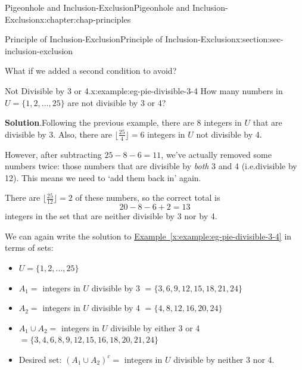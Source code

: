 \documentclass[oneside,10pt,]{book}
\newcommand{\blocktitlefont}{\relax}
\newcommand{\xreffont}{\relax}
\numberwithin{equation}{section}
\begin{document}
\begin{chapterptx}{Pigeonhole and Inclusion-Exclusion}{}{Pigeonhole and Inclusion-Exclusion}{}{}{x:chapter:chap-principles}
\begin{sectionptx}{Principle of Inclusion-Exclusion}{}{Principle of Inclusion-Exclusion}{}{}{x:section:sec-inclusion-exclusion}
%
\par
What if we added a second condition to avoid?%
\begin{example}{Not Divisible by 3 or 4.}{x:example:eg-pie-divisible-3-4}%
How many numbers in \(U = \{1,2,\ldots,25\}\) are not divisible by 3 or 4?%
\par\smallskip%
\noindent\textbf{\blocktitlefont Solution}.\hypertarget{g:solution:id478429}{}\quad{}Following the previous example, there are \(8\) integers in \(U\) that are divisible by 3. Also, there are \(\lfloor \frac{25}{4} \rfloor = 6\) integers in \(U\) not divisible by 4.%
\par
However, after subtracting \(25 - 8 - 6 = 11\), we've actually removed some numbers twice: those numbers that are divisible by \emph{both} 3 and 4 (i.e.\@ divisible by 12). This means we need to `add them back in' again.%
\par
There are \(\lfloor \frac{25}{12} \rfloor = 2\) of these numbers, so the correct total is%
\begin{equation*}
20 - 8 - 6 + 2 = 13
\end{equation*}
integers in the set that are neither divisible by 3 nor by 4.%
\end{example}
We can again write the solution to \hyperref[x:example:eg-pie-divisible-3-4]{Example~{\xreffont\ref{x:example:eg-pie-divisible-3-4}}} in terms of sets:%
\begin{itemize}[label=\textbullet]
\item{}\(\displaystyle U = \{1,2,\ldots,25\}\)%
\item{}\(A_1 = \) integers in \(U\) divisible by 3 \(= \{3,6,9,12,15,18,21,24\}\)%
\item{}\(A_2 = \) integers in \(U\) divisible by 4 \(= \{4,8,12,16,20,24\}\)%
\item{}\(A_1 \cup A_2 = \) integers in \(U\) divisible by either 3 or 4 \(= \{3,4,6,8,9,12,15,16,18,20,21,24\}\)%
\item{}Desired set: \((A_1 \cup A_2)^c = \) integers in \(U\) divisible by neither 3 nor 4.%
\end{itemize}
%
\begin{sidebyside}{1}{0.25}{0.25}{0}%
\begin{sbspanel}{0.5}%
\end{sbspanel}
\end{sidebyside}
\end{sectionptx}
\end{chapterptx}
\end{document}
